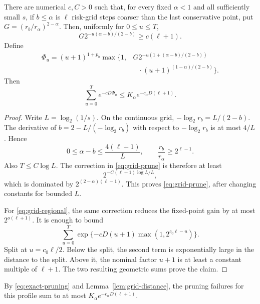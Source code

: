 \begin{lemma}
\label{lem:grid-distance}
There are numerical $c,C>0$ such that, for every fixed $\alpha<1$ and all sufficiently small $s$, if $b\leq\alpha$ is $\ell$ risk-grid steps coarser than the last conservative point, put $G=(r_b/r_\alpha)^{2-\alpha}$. Then, uniformly for $0\leq u\leq T$,
\begin{equation}
 G2^{-u(\alpha-b)/(2-b)}\geq c(\ell+1).
 \label{eq:grid-prune}
\end{equation}
Define
\begin{align}
 \Phi_u=(u+1)^{1+p_b}\max\bigl\{1,
 &G2^{-u(1+(\alpha-b)/(2-b))}\nonumber\\
 &\mathrel{\phantom{G}}\cdot
 (u+1)^{(1-\alpha)/(2-b)}\bigr\}.
 \label{eq:grid-phi}
\end{align}
Then
\begin{equation}
 \sum_{u=0}^T e^{-cD\Phi_u}
 \leq K_\alpha e^{-c_\alpha D(\ell+1)}.
 \label{eq:grid-regional}
\end{equation}
\end{lemma}

\begin{proof}
Write $L=\log_2(1/s)$. On the continuous grid, $-\log_2r_b=L/(2-b)$. The derivative of $b=2-L/(-\log_2r_b)$ with respect to $-\log_2r_b$ is at most $4/L$. Hence
\[
 0\leq\alpha-b\leq\frac{4(\ell+1)}L,
 \qquad
 \frac{r_b}{r_\alpha}\geq2^{\ell-1}.
\]
Also $T\leq C\log L$. The correction in \eqref{eq:grid-prune} is therefore at least
\[
 2^{-C(\ell+1)\log L/L},
\]
which is dominated by $2^{(2-\alpha)(\ell-1)}$. This proves \eqref{eq:grid-prune}, after changing constants for bounded $L$.

For \eqref{eq:grid-regional}, the same correction reduces the fixed-point gain by at most $2^{o(\ell+1)}$. It is enough to bound
\[
 \sum_{u=0}^T
 \exp\{-cD(u+1)\max(1,2^{c_0\ell-u})\}.
\]
Split at $u=c_0\ell/2$. Below the split, the second term is exponentially large in the distance to the split. Above it, the nominal factor $u+1$ is at least a constant multiple of $\ell+1$. The two resulting geometric sums prove the claim.
\end{proof}

By \eqref{eq:exact-pruning} and Lemma~\ref{lem:grid-distance}, the pruning failures for this profile sum to at most $K_\alpha e^{-c_\alpha D(\ell+1)}$.

